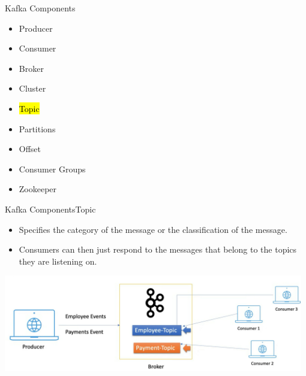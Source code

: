 \documentclass{beamer}
\begin{document}
\begin{frame}{Kafka Components}
  \begin{itemize}
    \item Producer
    \item Consumer
    \item Broker
    \item Cluster
    \item \hl{Topic}
    \item Partitions
    \item Offset
    \item Consumer Groups
    \item Zookeeper
  \end{itemize}
\end{frame}

\begin{frame}{Kafka Components}{Topic}
  \begin{itemize}
    \item Specifies the category of the message or the classification of the message.
    \item Consumers can then just respond to the messages that belong to the topics they are listening on.
  \end{itemize}
  \includegraphics[width=0.98\textwidth]{fig/topic.png}
\end{frame}
\end{document}
